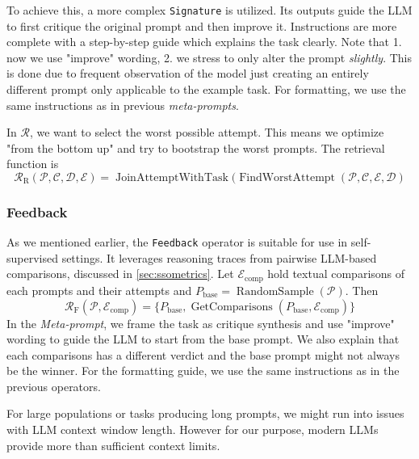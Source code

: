 To achieve this, a more complex \texttt{Signature} is utilized. Its outputs guide the LLM to first critique the original prompt
and then improve it. Instructions are more complete with a step-by-step guide which explains the task clearly.
Note that 1. now we use "improve" wording, 2. we stress to only alter the prompt \textit{slightly}. This is done due to 
frequent observation of the model just creating an entirely different prompt only applicable to the example task.
For formatting, we use the same instructions as in previous \textit{meta-prompts}.

In $\mathcal{R}$, we want to select the worst possible attempt. This means we optimize "from the bottom up" and try to bootstrap the
worst prompts. The retrieval function is
\begin{equation}
    \mathcal{R}_{\text{R}}(\mathcal{P}, \mathcal{C}, \mathcal{D}, \mathcal{E}) = \operatorname{JoinAttemptWithTask}(\operatorname{FindWorstAttempt}(\mathcal{P}, \mathcal{C}, \mathcal{E}, \mathcal{D})
\end{equation}


\subsubsection{Feedback}
As we mentioned earlier, the \texttt{Feedback} operator is suitable for use in self-supervised settings.
It leverages reasoning traces from pairwise LLM-based comparisons, discussed in \ref{sec:ssometrics}. 
Let $\mathcal{E}_{\text{comp}}$ hold textual comparisons of each prompts and their attempts and
$P_{\text{base}} = \operatorname{RandomSample}(\mathcal{P})$. Then
\begin{equation}
    \mathcal{R}_{\text{F}}(\mathcal{P}, \mathcal{E}_{\text{comp}}) = \{P_{\text{base}}, \operatorname{GetComparisons}(P_{\text{base}}, \mathcal{E}_{\text{comp}})\}
\end{equation}
In the \textit{Meta-prompt}, we frame the task as critique synthesis and use "improve" wording to guide the LLM to start from the base prompt.
We also explain that each comparisons has a different verdict and the base prompt might not always be the winner. For the formatting guide, we use the same instructions
as in the previous operators.

For large populations or tasks producing long prompts, we might run into issues with LLM context window length. 
However for our purpose, modern LLMs provide more than sufficient context limits. 

